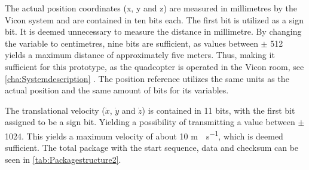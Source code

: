 The actual position coordinates (x, y and z) are measured in millimetres by the Vicon system and are contained in ten bits each. The first bit is utilized as a sign bit. It is deemed unnecessary to measure the distance in millimetre. By changing the variable to centimetres, nine bits are sufficient, as values between $\pm$ 512 yields a maximum distance of approximately five meters. Thus, making it sufficient for this prototype, as the quadcopter is operated in the Vicon room, see \autoref{cha:Systemdescription} . The position reference utilizes the same units as the actual position and the same amount of bits for its variables.

The translational velocity ($\dot{x}$, $\dot{y}$ and $\dot{z}$) is contained in 11 bits, with the first bit assigned to be a sign bit. Yielding a possibility of transmitting a value between $\pm$ 1024. This yields a maximum velocity of about 10 \si{m \cdot s^{-1}}, which is deemed sufficient. The total package with the start sequence, data and checksum can be seen in \autoref{tab:Packagestructure2}.

